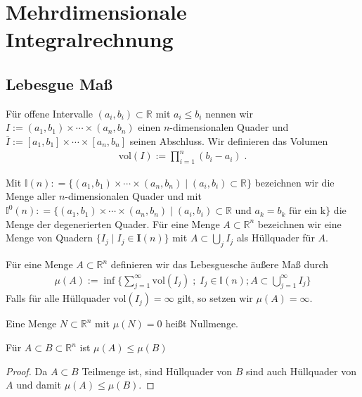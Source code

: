 
\section{Mehrdimensionale Integralrechnung}

\subsection{Lebesgue Maß}

Für offene Intervalle $(a_i,b_i) \subset \mathbb{R}$ mit $a_i \leq b_i$ nennen wir $I := (a_1,b_1) \times \cdots \times (a_n,b_n)$ einen $n$-dimensionalen Quader 
und $\bar{I}:= [a_1, b_1] \times \cdots \times [a_n,b_n]$ seinen Abschluss. Wir definieren das Volumen 
\begin{align*}
\text{vol} (I):=   \prod_{i = 1}^n (b_i -a_i)  \; .
\end{align*}

Mit $\mathbb{I}(n): = \{   (a_1,b_1) \times \cdots \times (a_n,b_n) \; | \;  (a_i, b_i) \subset \mathbb{R} \}$ bezeichnen wir die Menge aller $n$-dimensionalen Quader und mit $\mathbb{I}^0(n): = \{   (a_1,b_1) \times \cdots \times (a_n,b_n) \; | \;  (a_i, b_i) \subset \mathbb{R}  \text { und } a_k = b_k \text{ für ein k}\}$ die Menge der degenerierten Quader.  
Für eine Menge $A \subset \mathbb{R}^n$ bezeichnen wir eine Menge von Quadern $\{ I_j \; | \;  I_j \in \mathbf{I}(n)  \}$ mit $A \subset \bigcup_j I_j$ als Hüllquader für $A$.
\begin{Definition}
Für eine Menge $A \subset \mathbb{R}^n$ definieren wir das Lebesguesche äußere Maß durch 
\begin{align*}
\mu (A):=   \inf \biggl \{ \sum_{j=1}^{\infty}   \text{vol} (I_j)\; ; \; I_j \in \mathbb{I}(n); A \subset \bigcup_{j= 1}^{\infty} I_j \biggr \} 
\end{align*}
Falls für alle Hüllquader $\text{vol} (I_j) = \infty$ gilt, so setzen wir $\mu (A) = \infty$.
\end{Definition}

\begin{Definition}
\end{Definition}

\begin{Definition}[Nullmenge]
Eine Menge $N \subset \mathbb{R}^n$ mit $\mu (N) = 0$ heißt Nullmenge.
\end{Definition}


\begin{Bemerkung}
\label{massmonton}
Für $A \subset B \subset \mathbb{R}^n$ ist $\mu(A) \leq \mu(B)$
\end{Bemerkung}
\begin{proof}
Da $A \subset B$ Teilmenge ist, sind Hüllquader von $B$ sind auch Hüllquader von $A$ und damit  $\mu(A) \leq \mu(B)$.
\end{proof}

